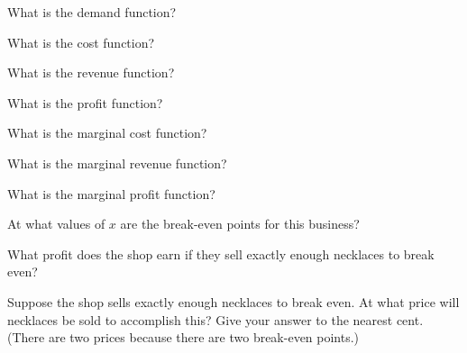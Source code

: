 \begin{ProblemSet}

 \begin{Problem}
  What is the demand function?
 \end{Problem}

 \begin{Problem}
  What is the cost function?
 \end{Problem}

 \begin{Problem}
  What is the revenue function?
 \end{Problem}

 \begin{Problem}
  What is the profit function?
 \end{Problem}

 \begin{Problem}
  What is the marginal cost function?
 \end{Problem}

 \begin{Problem}
  What is the marginal revenue function?
 \end{Problem}

 \begin{Problem}
  What is the marginal profit function?
 \end{Problem}

 \begin{Problem}[pencil space=4in]
  At what values of $x$ are the break-even points for this business?
 \end{Problem}

 \begin{Problem}
  What profit does the shop earn if they sell exactly enough necklaces to break even?
 \end{Problem}

 \begin{Problem}
  Suppose the shop sells exactly enough necklaces to break even.
  At what price will necklaces be sold to accomplish this?
  Give your answer to the nearest cent.
  (There are two prices because there are two break-even points.)
 \end{Problem}

\end{ProblemSet}

